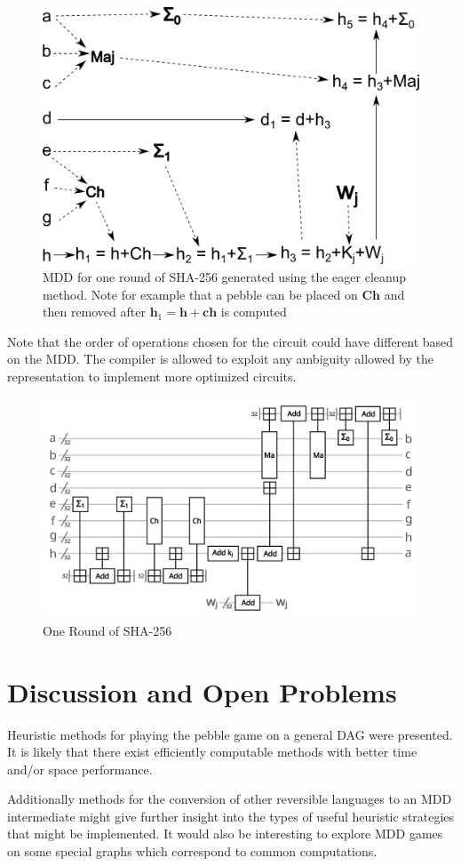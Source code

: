 \begin{figure}
      \capstart
      \centering
      \includegraphics[width=0.7\hsize]{images/sha_MDD}

      \caption{MDD for one round of SHA-256 generated using the eager cleanup
      method. Note for example that a pebble can be placed on $\mathbf{Ch}$ and
      then removed after $\mathbf{h}_1 = \mathbf{h}+\mathbf{ch}$ is computed}

      \label{fig:sha-MDD}
\end{figure}

Note that the order of operations chosen for the circuit could have different
based on the MDD. The compiler is allowed to exploit any ambiguity allowed by
the representation to implement more optimized circuits.

\begin{figure}
      \capstart
      \centering
      \includegraphics[width=0.9\hsize]{images/sha_round}
      \caption{One Round of SHA-256}
      \label{fig:sha}
\end{figure}

\section{Discussion and Open Problems} 

Heuristic methods for playing the pebble game on a general DAG were presented.
It is likely that there exist efficiently computable methods with better time
and/or space performance.  

Additionally methods for the conversion of other reversible languages to an MDD
intermediate might give further insight into the types of useful heuristic
strategies that might be implemented. It would also be interesting to explore
MDD games on some special graphs which correspond to common computations.
